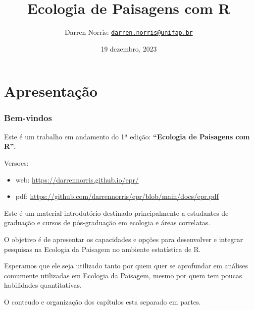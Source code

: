 \documentclass[
]{article}
\title{Ecologia de Paisagens com R}
\author{Darren Norris: \href{mailto:darren.norris@unifap.br}{\nolinkurl{darren.norris@unifap.br}}}
\date{19 dezembro, 2023}
\begin{document}
\maketitle

\renewcommand*\contentsname{Sumário}
{
\hypersetup{linkcolor=}
\setcounter{tocdepth}{3}
\tableofcontents
}
\newpage{}

\hypertarget{part-apresentauxe7uxe3o}{%
\part{Apresentação}\label{part-apresentauxe7uxe3o}}

\hypertarget{bem-vindos}{%
\section*{Bem-vindos}\label{bem-vindos}}

Este é um trabalho em andamento do 1ª edição:
\textbf{``Ecologia de Paisagens com R''}.

Versoes:

\begin{itemize}
\item
  web: \url{https://darrennorris.github.io/epr/}
\item
  pdf: \url{https://github.com/darrennorris/epr/blob/main/docs/epr.pdf}
\end{itemize}

Este é um material introdutório destinado principalmente a estudantes de graduação e cursos de pós-graduação em ecologia e áreas correlatas.

O objetivo é de apresentar os capacidades e opções para desenvolver e integrar pesquisas na Ecologia da Paisagem no ambiente estatística de R.

Esperamos que ele seja utilizado tanto por quem quer se aprofundar em análises comumente utilizadas em Ecologia da Paisagem, mesmo por quem tem poucas habilidades quantitativas.

O conteudo e organização dos capítulos esta separado em partes.
\end{document}
